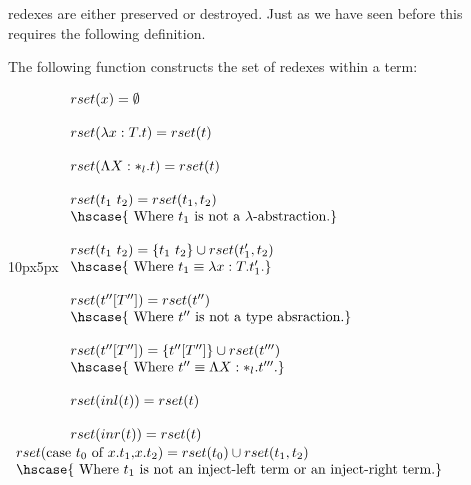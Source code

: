 redexes are either preserved or destroyed. Just as we have seen before
this requires the following definition.
\begin{definition}
  \label{def:rset_ssfp}
  The following function constructs the set of redexes within a
  term:\\
  \begin{changemargin}{10px}{5px}\noindent
    \begin{math}
      \begin{array}{lll}    
      rset(x) = \emptyset\\
      & \\
      rset(\lambda x:T.t) = rset(t)\\
      & \\
      rset(\Lambda X:*_l.t) = rset(t)\\
      & \\
      rset(t_1\ t_2) = rset(t_1, t_2)\\      
      \hscase{
        \text{ Where } t_1 \text{ is not a } \lambda \text{-abstraction.}
      }\\
      & \\
      rset(t_1\ t_2) = \{t_1\ t_2\} \cup rset(t'_1, t_2)\\
      \hscase{
        \text{ Where } t_1 \equiv \lambda x:T.t'_1.
      }\\
      & \\
      rset(t''[T'']) = rset(t'')\\
      \hscase{
        \text{ Where } t'' \text{ is not a type absraction.} 
      }\\
      & \\
      rset(t''[T'']) = \{t''[T'']\} \cup rset(t''') \\
      \hscase{
        \text{ Where } t'' \equiv \Lambda X:*_l.t'''.
      }\\
      & \\
      rset(inl(t)) = rset(t)\\
      & \\
      rset(inr(t)) = rset(t)\\
    \end{array}
  \end{math}
  \ \\
  \begin{math}
    \begin{array}{lll}     
      rset(\ccon{t_0}{x}{t_1}{t_2}) = rset(t_0) \cup rset(t_1,t_2)\\
      \hscase{
        \text{ Where } t_1 \text{ is not an inject-left term or an inject-right term.}
}
\end{array}
\end{math}
\end{changemargin}
\end{definition}
